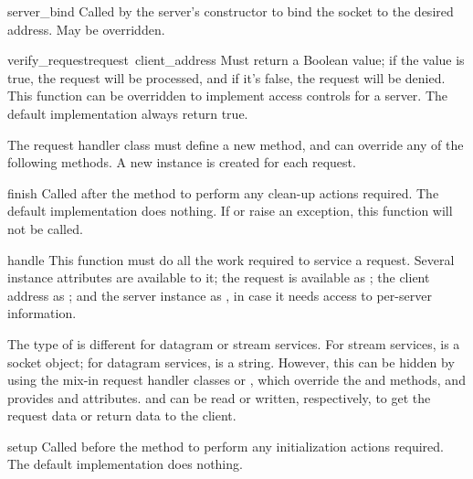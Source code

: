 \begin{funcdesc}{server_bind}{}
Called by the server's constructor to bind the socket to the desired
address.  May be overridden.
\end{funcdesc}

\begin{funcdesc}{verify_request}{request\, client_address}
Must return a Boolean value; if the value is true, the request will be
processed, and if it's false, the request will be denied.
This function can be overridden to implement access controls for a server.
The default implementation always return true.
\end{funcdesc}

The request handler class must define a new  method, and
can override any of the following methods.  A new instance is created
for each request.

\begin{funcdesc}{finish}{}
Called after the  method to perform any clean-up actions
required.  The default implementation does nothing.  If 
or  raise an exception, this function will not be called.
\end{funcdesc}

\begin{funcdesc}{handle}{}
This function must do all the work required to service a request.
Several instance attributes are available to it; the request is
available as ; the client address as
; and the server instance as , in
case it needs access to per-server information.

The type of  is different for datagram or stream
services.  For stream services,  is a socket
object; for datagram services,  is a string.
However, this can be hidden by using the mix-in request handler
classes
 or , which
override the  and  methods, and provides
 and  attributes.  
and  can be read or written, respectively, to get the
request data or return data to the client.
\end{funcdesc}

\begin{funcdesc}{setup}{}
Called before the  method to perform any initialization
actions required.  The default implementation does nothing.
\end{funcdesc}
